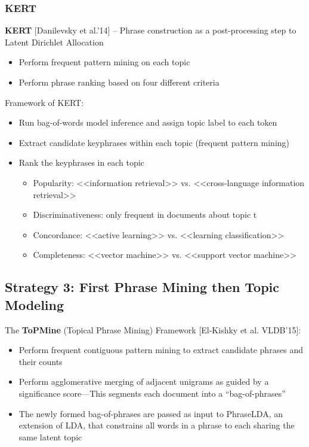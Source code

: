 \subsubsection{KERT}
\textbf{KERT} [Danilevsky et al.’14] – Phrase construction as a post-processing step to Latent Dirichlet Allocation
\begin{itemize}
\item Perform frequent pattern mining on each topic
\item Perform phrase ranking based on four different criteria
\end{itemize}

Framework of KERT:
\begin{itemize}
\item Run bag-of-words model inference and assign topic label to each token \item Extract candidate keyphrases within each topic (frequent pattern mining)
\item Rank the keyphrases in each topic
\begin{itemize}
\item Popularity: <<information retrieval>> vs. <<cross-language information retrieval>> 
\item Discriminativeness: only frequent in documents about topic t
\item Concordance: <<active learning>> vs. <<learning classification>>
\item Completeness: <<vector machine>> vs. <<support vector machine>>
\end{itemize}
\end{itemize}

\subsection{Strategy 3: First Phrase Mining then Topic Modeling}

The \textbf{ToPMine} (Topical Phrase Mining) Framework [El-Kishky et al. VLDB’15]:
\begin{itemize}
\item Perform frequent contiguous pattern mining to extract candidate phrases and
their counts
\item Perform agglomerative merging of adjacent unigrams as guided by a significance
score—This segments each document into a “bag-of-phrases”
\item The newly formed bag-of-phrases are passed as input to PhraseLDA, an extension of LDA, that constrains all words in a phrase to each sharing the same latent topic
\end{itemize}

